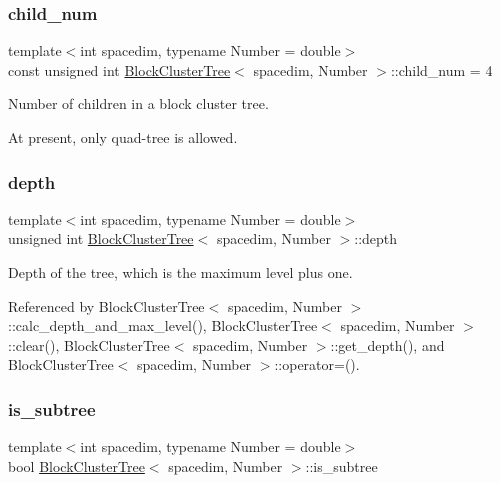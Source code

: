 \subsubsection{\texorpdfstring{child\+\_\+num}{child\_num}}
{\footnotesize\ttfamily template$<$int spacedim, typename Number = double$>$ \\
const unsigned int \hyperlink{classBlockClusterTree}{Block\+Cluster\+Tree}$<$ spacedim, Number $>$\+::child\+\_\+num = 4\hspace{0.3cm}{\ttfamily [static]}}

Number of children in a block cluster tree.

At present, only quad-\/tree is allowed. \mbox{\label{classBlockClusterTree_a77349ec9ccb36d45af3f176a93516897}} 
\subsubsection{\texorpdfstring{depth}{depth}}
{\footnotesize\ttfamily template$<$int spacedim, typename Number = double$>$ \\
unsigned int \hyperlink{classBlockClusterTree}{Block\+Cluster\+Tree}$<$ spacedim, Number $>$\+::depth\hspace{0.3cm}{\ttfamily [private]}}

Depth of the tree, which is the maximum level plus one. 

Referenced by Block\+Cluster\+Tree$<$ spacedim, Number $>$\+::calc\+\_\+depth\+\_\+and\+\_\+max\+\_\+level(), Block\+Cluster\+Tree$<$ spacedim, Number $>$\+::clear(), Block\+Cluster\+Tree$<$ spacedim, Number $>$\+::get\+\_\+depth(), and Block\+Cluster\+Tree$<$ spacedim, Number $>$\+::operator=().

\mbox{\label{classBlockClusterTree_a8dc01af98989bb71246fa2cd4d7307da}} 
\subsubsection{\texorpdfstring{is\+\_\+subtree}{is\_subtree}}
{\footnotesize\ttfamily template$<$int spacedim, typename Number = double$>$ \\
bool \hyperlink{classBlockClusterTree}{Block\+Cluster\+Tree}$<$ spacedim, Number $>$\+::is\+\_\+subtree\hspace{0.3cm}{\ttfamily [private]}}

